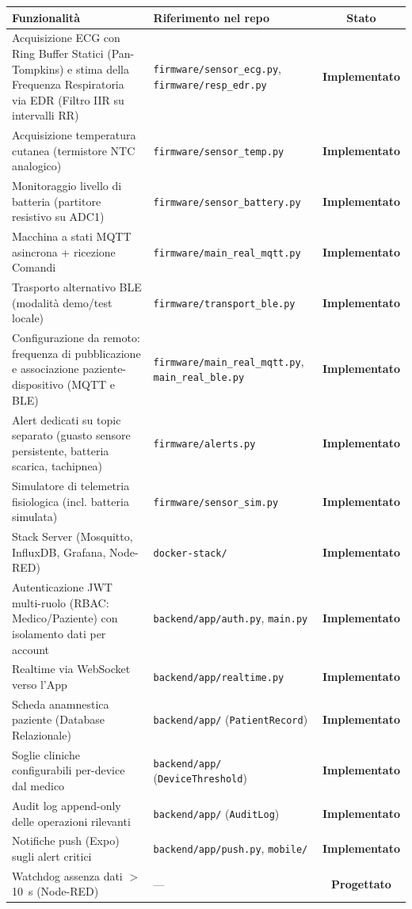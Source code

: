 \documentclass[11pt,a4paper]{article}
\newcommand{\IMPL}{\textcolor{okgreen}{\textbf{Implementato}}}
\newcommand{\PLAN}{\textcolor{planorange}{\textbf{Progettato}}}
\begin{document}
\begin{table}[h]
\centering
\small
\begin{tabularx}{\textwidth}{@{}Ylc@{}}
\toprule
\textbf{Funzionalità} & \textbf{Riferimento nel repo} & \textbf{Stato} \\
\midrule
Acquisizione ECG con Ring Buffer Statici (Pan-Tompkins) e stima della Frequenza Respiratoria via EDR (Filtro IIR su intervalli RR) & \texttt{firmware/sensor\_ecg.py}, \texttt{firmware/resp\_edr.py} & \IMPL \\
Acquisizione temperatura cutanea (termistore NTC analogico) & \texttt{firmware/sensor\_temp.py} & \IMPL \\
Monitoraggio livello di batteria (partitore resistivo su ADC1) & \texttt{firmware/sensor\_battery.py} & \IMPL \\
Macchina a stati MQTT asincrona + ricezione Comandi & \texttt{firmware/main\_real\_mqtt.py} & \IMPL \\
Trasporto alternativo BLE (modalità demo/test locale) & \texttt{firmware/transport\_ble.py} & \IMPL \\
Configurazione da remoto: frequenza di pubblicazione e associazione paziente-dispositivo (MQTT e BLE) & \texttt{firmware/main\_real\_mqtt.py}, \texttt{main\_real\_ble.py} & \IMPL \\
Alert dedicati su topic separato (guasto sensore persistente, batteria scarica, tachipnea) & \texttt{firmware/alerts.py} & \IMPL \\
Simulatore di telemetria fisiologica (incl. batteria simulata) & \texttt{firmware/sensor\_sim.py} & \IMPL \\
Stack Server (Mosquitto, InfluxDB, Grafana, Node-RED) & \texttt{docker-stack/} & \IMPL \\
Autenticazione JWT multi-ruolo (RBAC: Medico/Paziente) con isolamento dati per account & \texttt{backend/app/auth.py}, \texttt{main.py} & \IMPL \\
Realtime via WebSocket verso l'App & \texttt{backend/app/realtime.py} & \IMPL \\
Scheda anamnestica paziente (Database Relazionale) & \texttt{backend/app/} (\texttt{PatientRecord}) & \IMPL \\
Soglie cliniche configurabili per-device dal medico & \texttt{backend/app/} (\texttt{DeviceThreshold}) & \IMPL \\
Audit log append-only delle operazioni rilevanti & \texttt{backend/app/} (\texttt{AuditLog}) & \IMPL \\
Notifiche push (Expo) sugli alert critici & \texttt{backend/app/push.py}, \texttt{mobile/} & \IMPL \\
\midrule
Watchdog assenza dati $>$10~s (Node-RED) & --- & \PLAN \\
\bottomrule
\end{tabularx}
\end{table}
\end{document}

